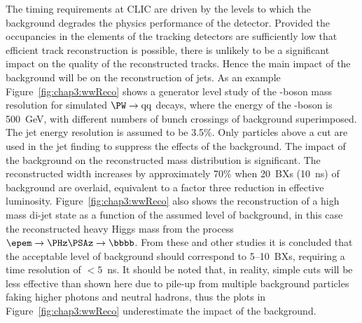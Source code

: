 The timing requirements at CLIC are driven by the levels to which the background
degrades the physics performance of the detector. Provided the occupancies in
the elements of the tracking detectors are sufficiently low that efficient
track reconstruction is possible, there is unlikely to be a significant impact
on the quality of the reconstructed tracks. Hence the main impact of the
background will be on the reconstruction of jets. As an example
Figure~\ref{fig:chap3:wwReco} shows a generator level study of the \PW-boson mass
resolution for simulated $\PW \rightarrow \mathrm{qq}$ decays, where the energy
of the \PW-boson is 500~GeV, with different numbers of bunch crossings of
\gghadrons background superimposed. The jet energy resolution is assumed to be
3.5\%. Only particles above a \pT cut are used in the jet finding to suppress
the effects of the \gghadrons background. 
The impact of the background on the reconstructed mass
distribution is significant. The reconstructed width increases by approximately
70\% when 20~BXs (10~ns) of background are overlaid, equivalent to a factor
three reduction in effective luminosity. 
Figure~\ref{fig:chap3:wwReco}  also shows
the reconstruction of a high mass di-jet state as a function of the assumed level of
background, in this case the reconstructed heavy Higgs mass from the process $\epem\rightarrow\PHz\PSAz\rightarrow \bbbb$.
From these and other studies it is
concluded that the acceptable level of background should correspond to 5--10~BXs, requiring a time resolution of
$<5$~ns. It should be noted that, in reality, simple \pT cuts will be less effective than shown here due to 
pile-up from multiple background particles faking higher \pT photons and neutral hadrons, thus the plots in 
Figure~\ref{fig:chap3:wwReco} underestimate the impact of the background.
